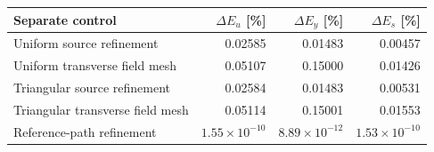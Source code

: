 \begin{tabular}{lrrr}
\toprule
Separate control & $\Delta E_u$ [\%] & $\Delta E_y$ [\%] & $\Delta E_s$ [\%] \\
\midrule
Uniform source refinement & 0.02585 & 0.01483 & 0.00457 \\
Uniform transverse field mesh & 0.05107 & 0.15000 & 0.01426 \\
Triangular source refinement & 0.02584 & 0.01483 & 0.00531 \\
Triangular transverse field mesh & 0.05114 & 0.15001 & 0.01553 \\
Reference-path refinement & $1.55\times10^{-10}$ & $8.89\times10^{-12}$ & $1.53\times10^{-10}$ \\
\bottomrule
\end{tabular}
